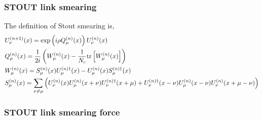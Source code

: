 \subsubsection{\label{sec:cw.stoutlink}STOUT link smearing}

The definition of Stout smearing is,
\begin{equation}
\begin{split}
&U_{\nu}^{(n+1)}(x)=\exp\left(i\rho Q_{\mu}^{(n)}(x)\right)U_{\nu}^{(n)}(x)\\
&Q_{\mu}^{(n)}(x)=\frac{1}{2i}\left(W_{\mu}^{(n)}(x)-\frac{1}{N_c}{\rm tr}\left[W_{\mu}^{(n)}(x)\right]\right)\\
&W_{\mu}^{(n)}(x)=S_{\mu}^{(n)}(x)U_{\mu}^{(n)\dagger}(x)-U_{\mu}^{(n)}(x)S_{\mu}^{(n)\dagger}(x)\\
&S_{\mu}^{(n)}(x)=\sum_{\nu\neq \mu}\left(U_{\nu}^{(n)}(x)U_{\mu}^{(n)}(x+\nu)U_{\nu}^{(n)\dagger}(x+\mu)+U_{\nu}^{(n)\dagger}(x-\nu)U_{\mu}^{(n)}(x-\nu)U_{\nu}^{(n)}(x+\mu-\nu)\right)\\
\end{split}
\end{equation}

\subsubsection{\label{sec:cw.stoutlinkforce}STOUT link smearing force}

